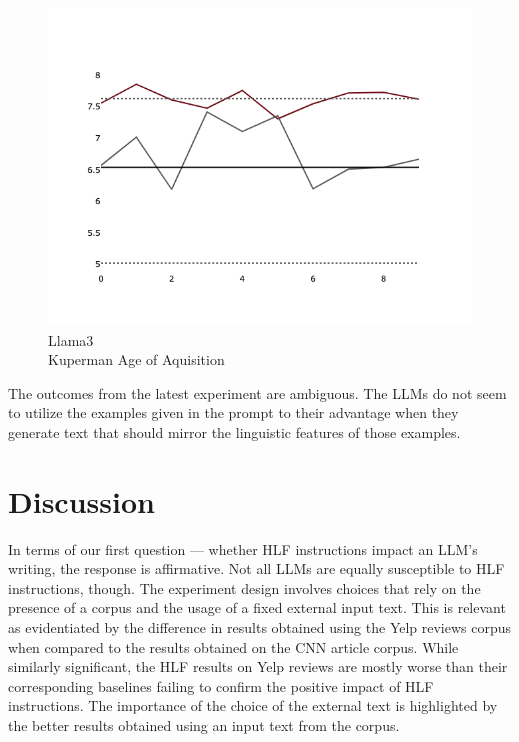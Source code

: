 \documentclass[11pt]{article}
\begin{document}
\begin{figure}[ht]
\begin{minipage}{0.32\textwidth}
    \end{minipage}
    \hfill
    \begin{minipage}{0.32\textwidth}
        \includegraphics[width=\linewidth]{plots/prompt_2_ifd/prompt_2-llama3_70b-cnn_dailymail/prompt_2-llama3_70b-cnn_dailymail_a_kup_pw.png}
        \caption[center]{Llama3\\Kuperman Age of Aquisition}\label{fig-p2-ifd-llama3-a-kup-pw}
    \end{minipage}
\end{figure}

The outcomes from the latest experiment are ambiguous. The LLMs do not seem to
utilize the examples given in the prompt to their advantage when they generate
text that should mirror the linguistic features of those examples.

\section{Discussion}

In terms of our first question --- whether HLF instructions impact an LLM's
writing, the response is affirmative.
Not all LLMs are equally susceptible to HLF instructions, though.
The experiment design involves choices that rely on the presence of a corpus and
the usage of a fixed external input text.
This is relevant as evidentiated by the difference in results obtained using the
Yelp reviews corpus when compared to the results obtained on the CNN article
corpus.
While similarly significant, the HLF results on Yelp reviews are mostly worse
than their corresponding baselines failing to confirm the positive impact of HLF
instructions.
The importance of the choice of the external text is highlighted by the better
results obtained using an input text from the corpus.
\end{document}
